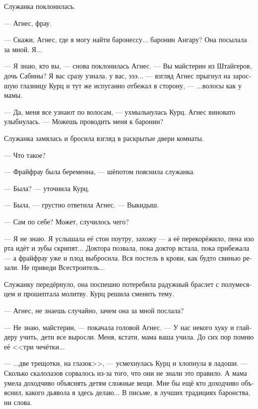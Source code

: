 \documentclass[a4paper,10pt,fleqn]{book}\usepackage{polyglossia}\setdefaultlanguage[babelshorthands=true]{russian}\setotherlanguage{english}\defaultfontfeatures{Ligatures=TeX,Mapping=tex-text}\usepackage{xcolor}\newcommand{\ml}[3]{#2}
\begin{document}
Служанка поклонилась.

--- Агнес, фрау.

--- Скажи, Агнес, где я могу найти баронессу... баронин Ангару?
Она посылала за мной.
Я...

--- Я знаю, кто вы, --- снова поклонилась Агнес.
\ml{$0$}
{--- Вы майстерин из Штайгеров, дочь Сабины?}
{``You're the \textit{meisterin}, Steiger kin, Sabina's daughter?}
Я вас сразу узнала, у вас, эээ... --- взгляд Агнес прыгнул на заросшую глазницу Курц и тут же испуганно отбежал в сторону, --- ...волосы как у мамы.

--- Да, меня все узнают по волосам, --- ухмыльнулась Курц.
Агнес виновато улыбнулась.
--- Можешь проводить меня к баронин?

Служанка замялась и бросила взгляд в раскрытые двери комнаты.

--- Что такое?

\ml{$0$}
{--- Фрайфрау была беременна, --- шёпотом пояснила служанка.}
{``Freifrau was pregnant,'' the servant quietly explained.}

\ml{$0$}
{--- Была? --- уточнила Курц.}
{``Was?'' Kurz asked.}

--- Была, --- грустно ответила Агнес.
\ml{$0$}
{--- Выкидыш.}
{``She lost the baby.''}

--- Сам по себе?
\ml{$0$}
{Может, случилось чего?}
{Maybe, something's happened?''}

--- Я не знаю.
Я услышала её стон поутру, захожу --- а её перекорёжило, пена изо рта идёт и зубы скрипят...
Доктора позвала, пока доктор встала, пока прибежала --- а фрайфрау уже и плод выбросила.
Вся постель в крови, как будто свинью резали.
Не приведи Всестроитель...

Служанку передёрнуло, она поспешно потеребила радужный браслет с полумесяцем и прошептала молитву.
Курц решила сменить тему.

--- Агнес, не знаешь случайно, зачем она за мной послала?

--- Не знаю, майстерин, --- покачала головой Агнес.
--- У нас некого хуку и глайдеру учить, дети все выросли.
Меня, кстати, мама ваша учила.
До сих пор помню её <<три чечётки...

--- ...две трещотки, на глазок>>, --- усмехнулась Курц и хлопнула в ладоши.
--- Сколько скалолазов сорвалось из-за того, что они не знали это правило.
А мама умела доходчиво объяснять детям сложные вещи.
Мне бы ещё кто доходчиво объяснил, какого дьявола я здесь делаю...
В письме, в лучших традициях баронства, ни слова.
\end{document}
